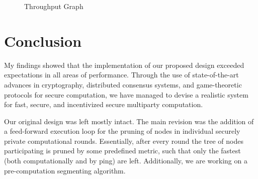\documentclass[journal,11pt]{IEEEtran}
\begin{document}
\begin{figure}[!t]
\centering
\hspace*{-1.5cm} 
\caption{Throughput Graph}
\label{graph_through}
\end{figure}
\par 


\section{Conclusion}
\par My findings showed that the implementation of our proposed design exceeded expectations in all areas of performance. Through the use of state-of-the-art advances in cryptography, distributed consensus systems, and game-theoretic protocols for secure computation, we have managed to devise a realistic system for fast, secure, and incentivized secure multiparty computation. 

\par Our original design was left mostly intact. The main revision was the addition of a feed-forward execution loop for the pruning of nodes in individual securely private computational rounds. Essentially, after every round the tree of nodes participating is pruned by some predefined metric, such that only the fastest (both computationally and by ping) are left. Additionally, we are working on a pre-computation segmenting algorithm.
\end{document}
